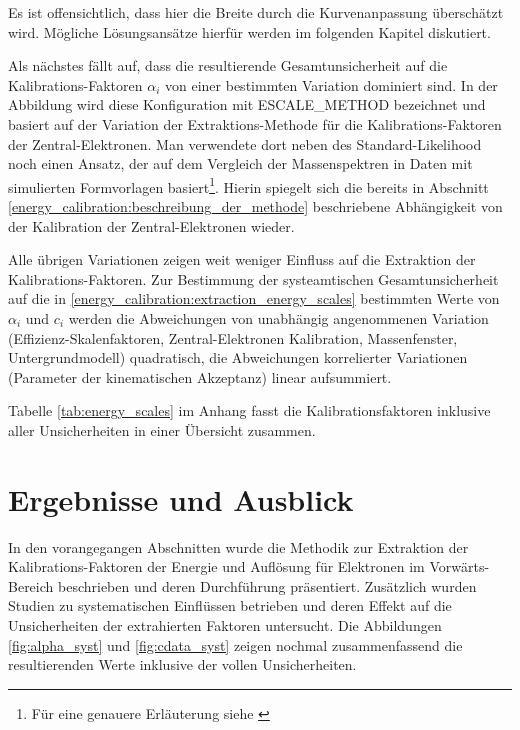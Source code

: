 Es ist offensichtlich, dass hier die Breite durch die Kurvenanpassung 
überschätzt wird. Mögliche Lösungsansätze hierfür werden im folgenden Kapitel
diskutiert.

Als nächstes fällt auf, dass die resultierende Gesamtunsicherheit auf die
Kalibrations-Faktoren $\alpha_i$ von einer bestimmten Variation dominiert sind.
In der Abbildung wird diese Konfiguration mit ESCALE\_METHOD bezeichnet und
basiert auf der Variation der Extraktions-Methode für die Kalibrations-Faktoren
der Zentral-Elektronen. Man verwendete dort neben des Standard-Likelihood noch
einen Ansatz, der auf dem Vergleich der Massenspektren in Daten mit simulierten
Formvorlagen basiert\footnote{Für eine genauere Erläuterung siehe
\cite{Agustoni:1335395}}. Hierin spiegelt sich die bereits in Abschnitt
\ref{energy_calibration:beschreibung_der_methode} beschriebene Abhängigkeit
von der Kalibration der Zentral-Elektronen wieder.

Alle übrigen Variationen zeigen weit weniger Einfluss auf die Extraktion der
Kalibrations-Faktoren. Zur Bestimmung der systeamtischen Gesamtunsicherheit auf
die in \ref{energy_calibration:extraction_energy_scales} bestimmten Werte von
$\alpha_i$ und $c_i$ werden die Abweichungen von unabhängig angenommenen
Variation (Effizienz-Skalenfaktoren, Zentral-Elektronen Kalibration,
Massenfenster, Untergrundmodell) quadratisch, die Abweichungen korrelierter
Variationen (Parameter der kinematischen Akzeptanz) linear aufsummiert.

Tabelle \ref{tab:energy_scales} im Anhang fasst die Kalibrationsfaktoren
inklusive aller Unsicherheiten in einer Übersicht zusammen.



%
\section{Ergebnisse und Ausblick}
\label{energy_calibration:ergebnisse_und_ausblick}


In den vorangegangen Abschnitten wurde die Methodik zur Extraktion der
Kalibrations-Faktoren der Energie und Auflösung für Elektronen im
Vorwärts-Bereich beschrieben und deren Durchführung präsentiert. Zusätzlich
wurden Studien zu systematischen Einflüssen betrieben und deren Effekt auf die
Unsicherheiten der extrahierten Faktoren untersucht. Die Abbildungen
\ref{fig:alpha_syst} und \ref{fig:cdata_syst} zeigen nochmal zusammenfassend
die resultierenden Werte inklusive der vollen Unsicherheiten.


